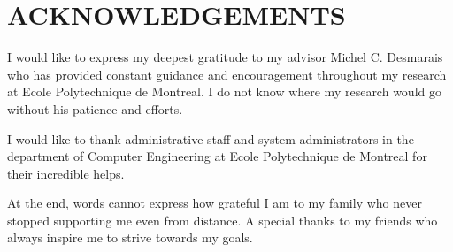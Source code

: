 %
\chapter*{ACKNOWLEDGEMENTS}\thispagestyle{headings}
%
I would like to express my deepest gratitude to my advisor Michel C. Desmarais who has provided constant guidance and encouragement throughout my research at Ecole Polytechnique de Montreal. I do not know where my research would go without his patience and efforts. 

I would like to thank administrative staff and system administrators in the department of Computer Engineering at Ecole Polytechnique de Montreal for their incredible helps.

At the end, words cannot express how grateful I am to my family who never stopped supporting me even from distance. A special thanks to my friends who always inspire me to strive towards my goals. 
